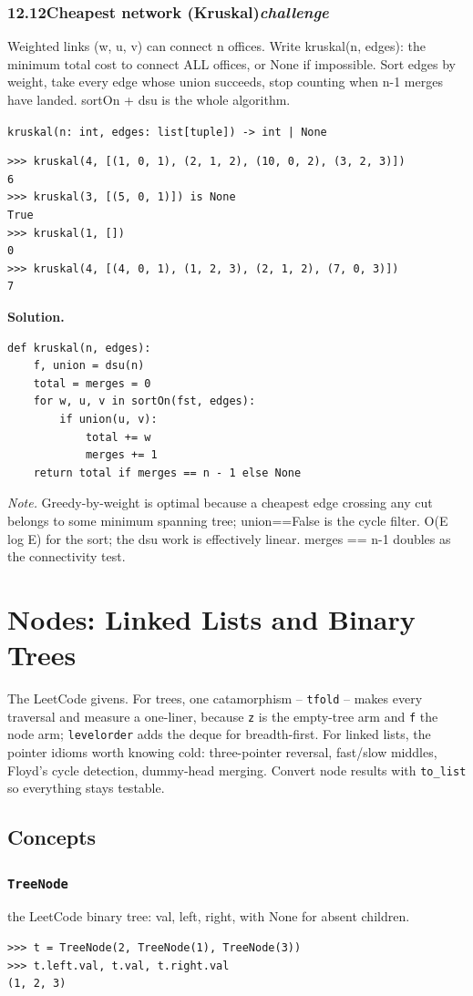 \documentclass[10pt,letterpaper]{book}
\begin{document}
\subsection*{12.12\quad Cheapest network (Kruskal)\hfill\textnormal{\textit{challenge}}}
Weighted links (w, u, v) can connect n offices. Write kruskal(n, edges): the minimum total cost to connect ALL offices, or None if impossible. Sort edges by weight, take every edge whose union succeeds, stop counting when n-1 merges have landed. sortOn + dsu is the whole algorithm.

\noindent\texttt{kruskal(n: int, edges: list[tuple]) -> int | None}
\begin{lstlisting}[style=ex]
>>> kruskal(4, [(1, 0, 1), (2, 1, 2), (10, 0, 2), (3, 2, 3)])
6
>>> kruskal(3, [(5, 0, 1)]) is None
True
>>> kruskal(1, [])
0
>>> kruskal(4, [(4, 0, 1), (1, 2, 3), (2, 1, 2), (7, 0, 3)])
7
\end{lstlisting}
\noindent\textbf{Solution.}
\begin{lstlisting}[style=code]
def kruskal(n, edges):
    f, union = dsu(n)
    total = merges = 0
    for w, u, v in sortOn(fst, edges):
        if union(u, v):
            total += w
            merges += 1
    return total if merges == n - 1 else None
\end{lstlisting}
\noindent\textit{Note.} Greedy-by-weight is optimal because a cheapest edge crossing any cut belongs to some minimum spanning tree; union==False is the cycle filter. O(E log E) for the sort; the dsu work is effectively linear. merges == n-1 doubles as the connectivity test.

\clearpage
\chapter{Nodes: Linked Lists and Binary Trees}

The LeetCode givens. For trees, one catamorphism -- \texttt{tfold} -- makes
every traversal and measure a one-liner, because \texttt{z} is the
empty-tree arm and \texttt{f} the node arm; \texttt{levelorder} adds the
deque for breadth-first. For linked lists, the pointer idioms worth knowing
cold: three-pointer reversal, fast/slow middles, Floyd's cycle detection,
dummy-head merging. Convert node results with \texttt{to\_list} so
everything stays testable.
\section{Concepts}
\subsection{\texttt{TreeNode}}\label{def:TreeNode}
the LeetCode binary tree: val, left, right, with None for absent children.
\begin{lstlisting}[style=ex]
>>> t = TreeNode(2, TreeNode(1), TreeNode(3))
>>> t.left.val, t.val, t.right.val
(1, 2, 3)
\end{lstlisting}
\end{document}
